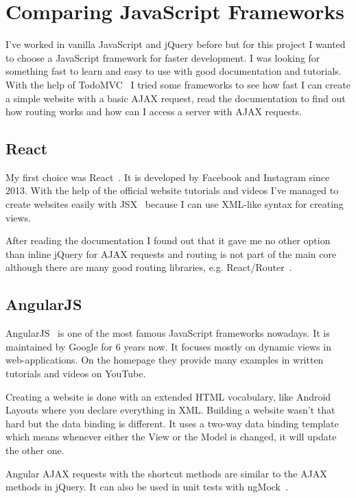 \chapter{Comparing JavaScript Frameworks}

I've worked in vanilla JavaScript and jQuery before but for this project I wanted to choose a JavaScript framework for faster development. I was looking for something fast to learn and easy to use with good documentation and tutorials. With the help of TodoMVC~\cite{TodoMVC} I tried some frameworks to see how fast I can create a simple website with a basic AJAX request, read the documentation to find out how routing works and how can I access a server with AJAX requests. 


\section{React}

My first choice was React~\cite{React}. It is developed by Facebook and Instagram since 2013. With the help of the official website tutorials and videos I've managed to create websites easily with JSX~\cite{JSX} because I can use XML-like syntax for creating views. 

After reading the documentation I found out that it gave me no other option than inline jQuery for AJAX requests and routing is not part of the main core although there are many good routing libraries, e.g. React/Router~\cite{React-Router}. 


\section{AngularJS}

AngularJS~\cite{Angular} is one of the most famous JavaScript frameworks nowadays.  It is maintained by Google for 6 years now. It focuses mostly on dynamic views in web-applications. On the homepage they provide many examples in written tutorials and videos on YouTube. 

Creating a website is done with an extended HTML vocabulary, like Android Layouts where you declare everything in XML. Building a website wasn't that hard but the data binding is different. It uses a two-way data binding template~\cite{Angular-Developer-DataBinding} which means whenever either the View or the Model is changed, it will update the other one.

Angular AJAX requests with the shortcut methods are similar to the AJAX methods in jQuery. It can also be used in unit tests with ngMock~\cite{Angular-AJAX}.

